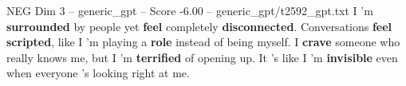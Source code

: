 \begin{textsample}{NEG Dim 3 – generic\_gpt – Score -6.00 – generic\_gpt/t2592\_gpt.txt}  \label{ex:f3_neg_005}
I ’m \textbf{surrounded} by people yet \textbf{feel} completely \textbf{disconnected}.
Conversations \textbf{feel} \textbf{scripted}, like I ’m playing a \textbf{role} instead of being myself.
I \textbf{crave} someone who really knows me, but I ’m \textbf{terrified} of opening up.
It ’s like I ’m \textbf{invisible} even when everyone ’s looking right at me.

\end{textsample}
